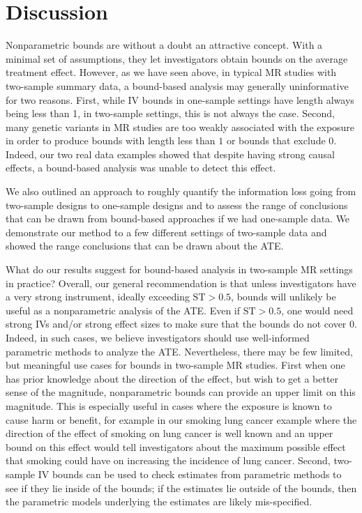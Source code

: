 \documentclass[
]{article}
\theoremstyle{plain}
\begin{document}
\hypertarget{discussion}{%
\section{\texorpdfstring{Discussion \label{conclusion-and-practical-considerations}}{Discussion }}\label{discussion}}

Nonparametric bounds are without a doubt an attractive concept. With a minimal set of assumptions, they let investigators obtain bounds on the average treatment effect. However, as we have seen above, in typical MR studies with two-sample summary data, a bound-based analysis may generally uninformative for two reasons. First, while IV bounds in one-sample settings have length always being less than 1, in two-sample settings, this is not always the case. Second, many genetic variants in MR studies are too weakly associated with the exposure in order to produce bounds with length less than \(1\) or bounds that exclude \(0\). Indeed, our two real data examples showed that despite having strong causal effects, a bound-based analysis was unable to detect this effect.

We also outlined an approach to roughly quantify the information loss going from two-sample designs to one-sample designs and to assess the range of conclusions that can be drawn from bound-based approaches if we had one-sample data. We demonstrate our method to a few different settings of two-sample data and showed the range conclusions that can be drawn about the ATE.

What do our results suggest for bound-based analysis in two-sample MR settings in practice? Overall, our general recommendation is that unless investigators have a very strong instrument, ideally exceeding \(\text{ST} > 0.5\), bounds will unlikely be useful as a nonparametric analysis of the ATE. Even if \(\text{ST} > 0.5\), one would need strong IVs and/or strong effect sizes to make sure that the bounds do not cover \(0\). Indeed, in such cases, we believe investigators should use well-informed parametric methods to analyze the ATE. Nevertheless, there may be few limited, but meaningful use cases for bounds in two-sample MR studies. First when one has prior knowledge about the direction of the effect, but wish to get a better sense of the magnitude, nonparametric bounds can provide an upper limit on this magnitude. This is especially useful in cases where the exposure is known to cause harm or benefit, for example in our smoking lung cancer example where the direction of the effect of smoking on lung cancer is well known and an upper bound on this effect would tell investigators about the maximum possible effect that smoking could have on increasing the incidence of lung cancer. Second, two-sample IV bounds can be used to check estimates from parametric methods to see if they lie inside of the bounds; if the estimates lie outside of the bounds, then the parametric models underlying the estimates are likely mis-specified.
\end{document}
